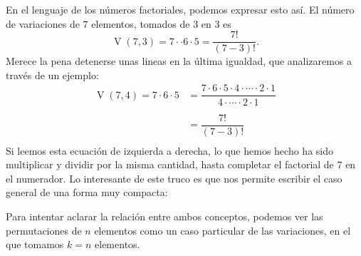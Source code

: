 En el lenguaje de los n\'umeros factoriales, podemos expresar esto así. El número de variaciones de $7$ elementos, tomados de $3$ en $3$ es
    	\[\operatorname{V}(7,3)=7\cdot\cdot 6 \cdot 5=\dfrac{7!}{(7-3)!}.\]
Merece la pena detenerse unas lineas en la \'ultima igualdad,
que analizaremos a través de un ejemplo:
\[\begin{array}{rl}
\operatorname{V}(7,4)=7\cdot 6\cdot 5 & =
\dfrac{7 \cdot 6 \cdot 5 \cdot 4 \cdot \cdots \cdot 2 \cdot 1}{4 \cdot \cdots \cdot 2 \cdot 1}\\
	& \\
	& =\dfrac{7!}{(7-3)!}\\
\end{array}
\]
Si leemos esta ecuación de izquierda a derecha, lo que hemos hecho ha sido multiplicar y dividir por la misma cantidad, hasta completar el factorial de $7$ en el numerador. %
%
Lo interesante de este truco es que nos permite escribir el caso general de una forma muy compacta:
    \begin{center}
    \end{center}
%
Para intentar aclarar la relación entre ambos conceptos, podemos ver las permutaciones de $n$ elementos como un caso particular de las variaciones, en el que tomamos $k=n$ elementos.

